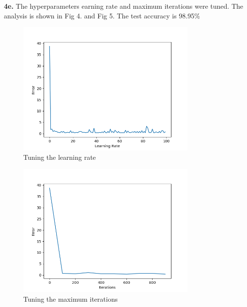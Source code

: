 \documentclass[letterpaper]{article}
\begin{document}
\noindent \textbf{4e.} The hyperparameters earning rate and maximum iterations were tuned. The analysis is shown in Fig 4. and Fig 5. The test accuracy is 98.95\%

 \begin{figure}
	\centering
	\includegraphics[width=0.8\textwidth]{variation_learning_rate_img2.png}
	\caption{\label{fig:data} Tuning the learning rate}
\end{figure}

 \begin{figure}
	\centering
	\includegraphics[width=0.8\textwidth]{variation_max_iters_img3.png}
	\caption{\label{fig:data} Tuning the maximum iterations}
\end{figure}
\end{document}
